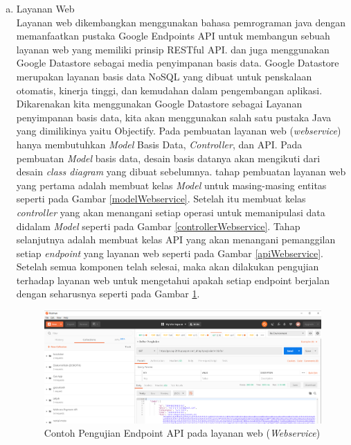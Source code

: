 	\begin{enumerate}[a.]
		\item Layanan Web
		\\ Layanan web dikembangkan menggunakan bahasa pemrograman java dengan memanfaatkan pustaka Google Endpoints API untuk membangun sebuah layanan web yang memiliki prinsip RESTful API. dan juga menggunakan Google Datastore sebagai media penyimpanan basis data. Google Datastore merupakan layanan basis data NoSQL yang dibuat untuk penskalaan otomatis, kinerja tinggi, dan kemudahan dalam pengembangan aplikasi. Dikarenakan kita menggunakan Google Datastore sebagai Layanan penyimpanan basis data, kita akan menggunakan salah satu pustaka Java yang dimilikinya yaitu Objectify. Pada pembuatan layanan web (\textit{webservice}) hanya membutuhkan \textit{Model} Basis Data, \textit{Controller}, dan API. Pada pembuatan \textit{Model} basis data, desain basis datanya akan mengikuti dari desain \textit{class diagram} yang dibuat sebelumnya. tahap pembuatan layanan web yang pertama adalah membuat kelas \textit{Model} untuk masing-masing entitas seperti pada Gambar \ref{modelWebservice}. Setelah itu membuat kelas \textit{controller} yang akan menangani setiap operasi untuk memanipulasi data didalam \textit{Model} seperti pada Gambar \ref{controllerWebservice}. 
		Tahap selanjutnya adalah membuat kelas API yang akan menangani pemanggilan setiap \textit{endpoint} yang layanan web seperti pada Gambar \ref{apiWebservice}. Setelah semua komponen telah selesai, maka akan dilakukan pengujian terhadap layanan web untuk mengetahui apakah setiap endpoint berjalan dengan seharusnya seperti pada Gambar \ref{pengujianApi}.
		
		
	
		\begin{figure}[H]
			\center
			\includegraphics [width = 12cm]{gambar/pengujianApi}
			\caption{Contoh Pengujian Endpoint API pada layanan web (\textit{Webservice})}
			\label{pengujianApi}
		\end{figure} 
		

\end{enumerate}
